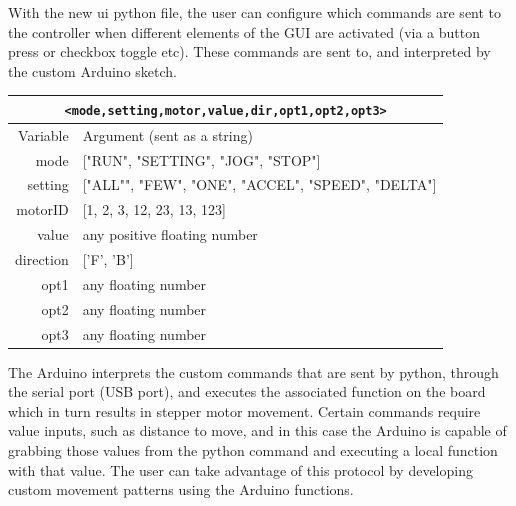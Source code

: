 \documentclass[10pt]{article} %
\begin{document}
	
	\begin{minipage}[t]{.66\linewidth} %
		With the new ui python file, the user can configure which commands are sent to the controller when different elements of the GUI are activated (via a button press or checkbox toggle etc). These commands are sent to, and interpreted by the custom Arduino sketch.
		


		\begin{center}
	
			\begin{tabular}{@{}rl@{}}
				\multicolumn{2}{c}{ \texttt{<mode,setting,motor,value,dir,opt1,opt2,opt3>}} \\
				\toprule
				\cmidrule(r){1-2}
				Variable & Argument (sent as a string)\\
				\midrule
				mode & ["RUN", "SETTING", "JOG", "STOP"]\\
				setting & ["ALL"", "FEW", "ONE", "ACCEL", "SPEED", "DELTA"]\\
				motorID & [1, 2, 3, 12, 23, 13, 123] \\
				value & any positive floating number\\
				direction & ['F', 'B']\\
				opt1 & any floating number\\
				opt2 & any floating number\\
				opt3 & any floating number\\
				\bottomrule
			\end{tabular}
		\end{center}

		
		The Arduino interprets the custom commands that are sent by python, through the serial port (USB port), and executes the associated function on the board which in turn results in stepper motor movement. Certain commands require value inputs, such as distance to move, and in this case the Arduino is capable of grabbing those values from the python command and executing a local function with that value. The user can take advantage of this protocol by developing custom movement patterns using the Arduino functions. 
		
		
		
		
		

\end{minipage}
\end{document}
